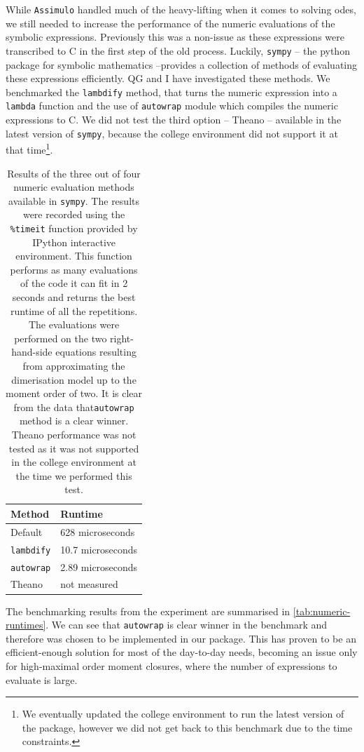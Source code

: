 While \verb"Assimulo" handled much of the heavy-lifting when it comes to solving \glspl{ode}, we still needed to increase the performance of the numeric evaluations of the symbolic expressions. 
Previously this was a non-issue as these expressions were transcribed to C in the first step of the old process. 
Luckily, \verb"sympy" -- the python package for symbolic mathematics --provides a collection of methods of evaluating these expressions efficiently. QG and I have investigated these methods.
We benchmarked the \verb"lambdify" method, that turns the numeric expression into a \verb"lambda" function and the use of  \verb"autowrap" module which compiles the numeric expressions to C.
We did not test the third option -- Theano\cite{bergstra_theano:_2010} -- available in the latest version of \verb"sympy", because the college environment did not support it at that time\footnote{We eventually updated the college environment to run the latest version of the package, however we did not get back to this benchmark due to the time constraints.}.

\begin{table}
    \centering
    \begin{tabular}{l|l}
    Method & Runtime \\
    \hline
    Default & 628 microseconds \\
    \verb"lambdify" & 10.7 microseconds \\
    \verb"autowrap" & 2.89 microseconds \\
    Theano & not measured \\
    \end{tabular}
    \caption{Results of the three out of four numeric evaluation methods available in {\tt sympy}. 
    The results were recorded using the {\tt \%timeit} 
    function provided by IPython\cite{perez_ipython:_2007} interactive environment. 
    This function performs as many evaluations of the code it can fit in 2 seconds and returns the best runtime of all the repetitions.
    The evaluations were performed on the two right-hand-side equations resulting from approximating the dimerisation model up to the moment order of two.
    It is clear from the data that{\tt autowrap} method is a clear winner. 
    Theano performance was not tested as it was not supported in the college environment at the time we performed this test.}
    \label{tab:numeric-runtimes}
\end{table}

The benchmarking results from the experiment are summarised in \autoref{tab:numeric-runtimes}. 
We can see that \verb"autowrap" is clear winner in the benchmark and therefore was chosen to be implemented in our package.
This has proven to be an efficient-enough solution for most of the day-to-day needs, becoming an issue only for high-maximal order moment closures, where the number of expressions to evaluate is large.

